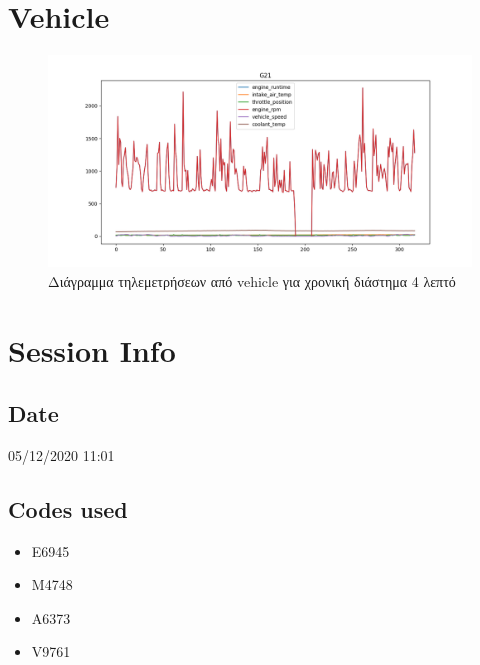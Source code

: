 \documentclass{article}
\begin{document}
\section{Vehicle}

\begin{figure}[H]
  \begin{center}
    \includegraphics[width=\textwidth]{G21.png}
  \end{center}
  \caption{Διάγραμμα τηλεμετρήσεων από vehicle για χρονική διάστημα 4 λεπτό}
\end{figure}

\section{Session Info}

\subsection{Date}
05/12/2020 11:01

\subsection{Codes used}

\begin{itemize}
  \item E6945
  \item M4748
  \item A6373
  \item V9761
\end{itemize}
\end{document}
